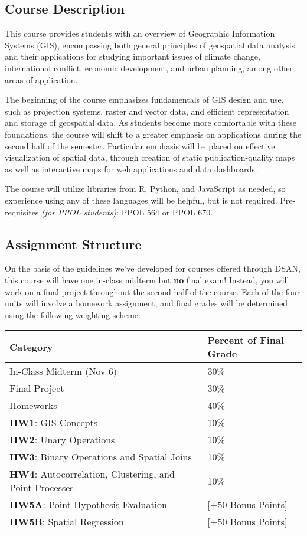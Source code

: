 \documentclass[
]{scrartcl}
\begin{document}
\subsection{Course Description}\label{course-description}

This course provides students with an overview of Geographic Information
Systems (GIS), encompassing both general principles of geospatial data
analysis and their applications for studying important issues of climate
change, international conflict, economic development, and urban
planning, among other areas of application.

The beginning of the course emphasizes fundamentals of GIS design and
use, such as projection systems, raster and vector data, and efficient
representation and storage of geospatial data. As students become more
comfortable with these foundations, the course will shift to a greater
emphasis on applications during the second half of the semester.
Particular emphasis will be placed on effective visualization of spatial
data, through creation of static publication-quality maps as well as
interactive maps for web applications and data dashboards.

The course will utilize libraries from R, Python, and JavaScript as
needed, so experience using any of these languages will be helpful, but
is not required. Pre-requisites \emph{(for PPOL students)}: PPOL 564 or
PPOL 670.

\subsection{Assignment Structure}\label{assignment-structure}

On the basis of the guidelines we've developed for courses offered
through DSAN, this course will have one in-class midterm but \textbf{no}
final exam! Instead, you will work on a final project throughout the
second half of the course. Each of the four units will involve a
homework assignment, and final grades will be determined using the
following weighting scheme:

\begin{longtable}[]{@{}ll@{}}
\toprule\noalign{}
Category & Percent of Final Grade \\
\midrule\noalign{}
\endhead
\bottomrule\noalign{}
\endlastfoot
In-Class Midterm (Nov 6) & 30\% \\
Final Project & 30\% \\
Homeworks & 40\% \\
\textbf{HW1}: GIS Concepts & 10\% \\
\textbf{HW2}: Unary Operations & 10\% \\
\textbf{HW3}: Binary Operations and Spatial Joins & 10\% \\
\textbf{HW4}: Autocorrelation, Clustering, and Point Processes & 10\% \\
\textbf{HW5A}: Point Hypothesis Evaluation & {[}+50 Bonus Points{]} \\
\textbf{HW5B}: Spatial Regression & {[}+50 Bonus Points{]} \\
\end{longtable}
\end{document}
